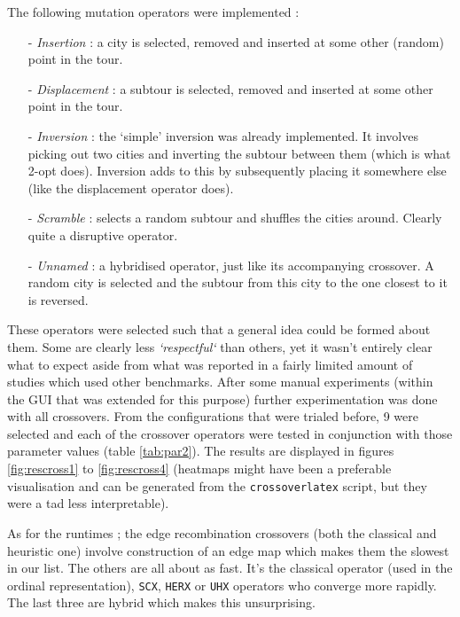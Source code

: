 The following mutation operators were implemented :
\begin{itemize}
\item[-] \textit{Insertion} : a city is selected, removed and inserted at some other (random) point in the tour.
\item[-] \textit{Displacement} : a subtour is selected, removed and inserted at some other point in the tour.
\item[-] \textit{Inversion} : the `simple' inversion was already implemented. It involves picking out two cities and inverting the subtour between them (which is what 2-opt does). Inversion adds to this by subsequently placing it somewhere else (like the displacement operator does).
\item[-] \textit{Scramble} : selects a random subtour and shuffles the cities around. Clearly quite a disruptive operator.
\item[-] \textit{Unnamed} : a hybridised operator, just like its accompanying crossover. A random city is selected and the subtour from this city to the one closest to it is reversed.
\end{itemize}
These operators were selected such that a general idea could be formed about them. Some are clearly less \textit{`respectful`} than others, yet it wasn't entirely clear what to expect aside from what was reported in a fairly limited amount of studies which used other benchmarks. After some manual experiments (within the GUI that was extended for this purpose) further experimentation was done with all crossovers. From the configurations that were trialed before, 9 were selected and each of the crossover operators were tested in conjunction with those parameter values (table \ref{tab:par2}). The results are displayed in figures \ref{fig:rescross1} to \ref{fig:rescross4} (heatmaps might have been a preferable visualisation and can be generated from the \texttt{crossoverlatex} script, but they were a tad less interpretable).\\

\par\noindent As for the runtimes ; the edge recombination crossovers (both the classical and heuristic one) involve construction of an edge map which makes them the slowest in our list. The others are all about as fast. It's the classical operator (used in the ordinal representation), \texttt{SCX}, \texttt{HERX} or \texttt{UHX} operators who converge more rapidly. The last three are hybrid which makes this unsurprising.

